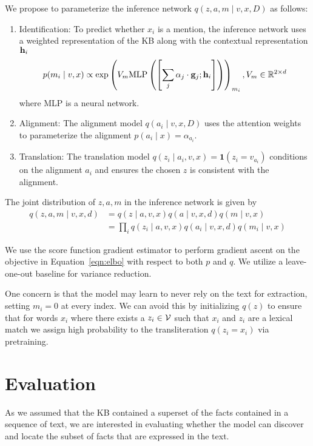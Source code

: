 \documentclass[12pt]{article}
\begin{document}
We propose to parameterize the inference network $q(z,a,m\mid v,x,D)$ as follows:
\begin{enumerate}
\item Identification: To predict whether $x_i$ is a mention,
    the inference network uses a weighted representation of the KB
    along with the contextual representation $\mathbf{h}_i$
    \begin{equation}
    p(m_i \mid v,x) \propto
    \exp\left(V_m
    \textrm{MLP}\left(\left[\sum_j \alpha_j \cdot \mathbf{g}_j; \mathbf{h}_i\right]\right)\right)_{m_i},
    V_m \in \mathbb{R}^{2 \times d}
    \end{equation}
    where MLP is a neural network.
\item Alignment: The alignment model $q(a_i \mid v,x,D)$
    uses the attention weights to parameterize the alignment
    $p(a_i \mid x) = \alpha_{a_i}$.
\item Translation: The translation model
    $q(z_i \mid a_i,v,x) = \mathbf{1}(z_i = v_{a_i})$
    conditions on the alignment $a_i$ and ensures the chosen $z$ is consistent
    with the alignment. 
\end{enumerate}

The joint distribution of $z,a,m$ in the inference network is given by
\begin{equation}
\label{eqn:elbo}
\begin{aligned}
q(z,a,m\mid v,x,d) &= q(z \mid a,v,x)q(a\mid v,x,d)q(m \mid v,x)\\
&= \prod_i q(z_i \mid a,v,x)q(a_i \mid v,x,d)q(m_i \mid v,x)
\end{aligned}
\end{equation}

We use the score function gradient estimator
to perform gradient ascent on the objective
in Equation~\ref{eqn:elbo} with respect to both $p$ and $q$.
We utilize a leave-one-out baseline for variance reduction.

One concern is that the model may learn to never rely on the text for extraction,
setting $m_i = 0$ at every index.
We can avoid this by initializing $q(z)$ to ensure that for words $x_i$
where there exists a $z_i \in \mathcal{V}$ such that $x_i$ and $z_i$ are a lexical match
we assign high probability to the transliteration $q(z_i = x_i)$
via pretraining.

\section{Evaluation}
As we assumed that the KB contained a superset of the facts contained in
a sequence of text, we are interested in evaluating whether the model can discover
and locate the subset of facts that are expressed in the text.
\end{document}
